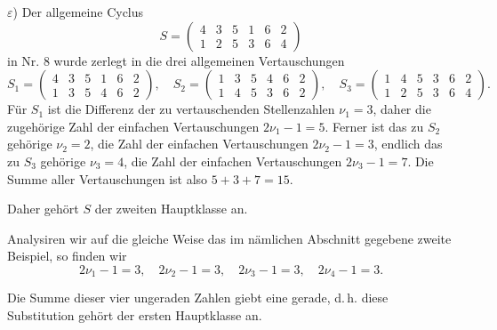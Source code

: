 \documentclass[11pt]{article}
\providecommand{\weberpage}[1]{}
\begin{document}
$\varepsilon$) Der allgemeine Cyclus
\[
S = \begin{pmatrix} 4 & 3 & 5 & 1 & 6 & 2 \\ 1 & 2 & 5 & 3 & 6 & 4 \end{pmatrix}
\]
in Nr. 8 wurde zerlegt in die drei allgemeinen Vertauschungen
\[
S_1 = \begin{pmatrix} 4 & 3 & 5 & 1 & 6 & 2 \\ 1 & 3 & 5 & 4 & 6 & 2 \end{pmatrix}, \quad S_2 = \begin{pmatrix} 1 & 3 & 5 & 4 & 6 & 2 \\ 1 & 4 & 5 & 3 & 6 & 2 \end{pmatrix}, \quad S_3 = \begin{pmatrix} 1 & 4 & 5 & 3 & 6 & 2 \\ 1 & 2 & 5 & 3 & 6 & 4 \end{pmatrix}.
\]
Für $S_1$ ist die Differenz der zu vertauschenden Stellenzahlen $\nu_1 = 3$, daher die zugehörige Zahl der einfachen Vertauschungen $2\nu_1 - 1 = 5$. Ferner ist das zu $S_2$ gehörige $\nu_2 = 2$, die Zahl der einfachen Vertauschungen $2\nu_2 - 1 = 3$, endlich das zu $S_3$ gehörige $\nu_3 = 4$, die Zahl der einfachen Vertauschungen $2\nu_3 - 1 = 7$. Die Summe aller Vertauschungen ist also $5 + 3 + 7 = 15$.

Daher gehört $S$ der zweiten Hauptklasse an.

Analysiren wir auf die gleiche Weise das im nämlichen Abschnitt gegebene zweite Beispiel, so finden wir
\[
2\nu_1 - 1 = 3, \quad 2\nu_2 - 1 = 3, \quad 2\nu_3 - 1 = 3, \quad 2\nu_4 - 1 = 3.
\]


\weberpage{14}
Die Summe dieser vier ungeraden Zahlen giebt eine gerade, d.\,h. diese Substitution gehört der ersten Hauptklasse an.
\end{document}
